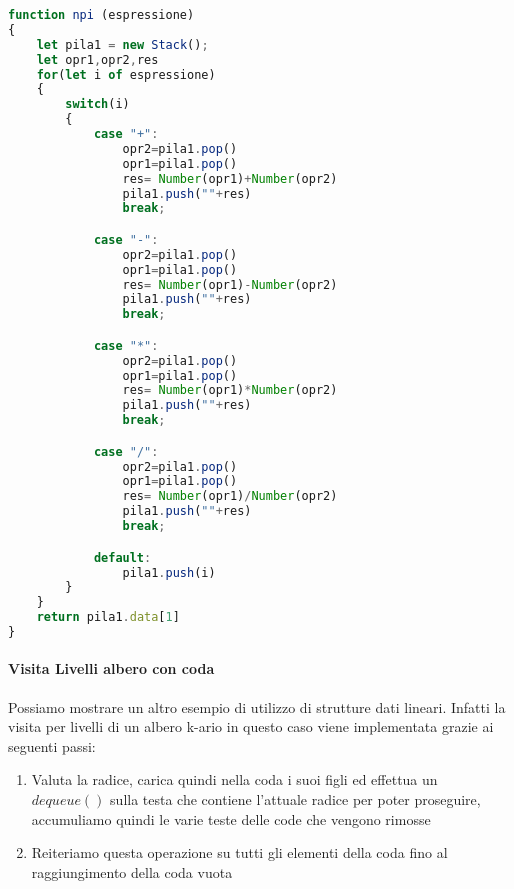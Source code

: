 \documentclass{article}
\begin{document}
\begin{lstlisting}[language=JavaScript]
function npi (espressione)
{
    let pila1 = new Stack();
    let opr1,opr2,res
    for(let i of espressione)
    {
        switch(i)
        {
            case "+":
                opr2=pila1.pop()
                opr1=pila1.pop()
                res= Number(opr1)+Number(opr2)
                pila1.push(""+res)
                break;

            case "-":
                opr2=pila1.pop()
                opr1=pila1.pop()
                res= Number(opr1)-Number(opr2)
                pila1.push(""+res)
                break;

            case "*":
                opr2=pila1.pop()
                opr1=pila1.pop()
                res= Number(opr1)*Number(opr2)
                pila1.push(""+res)
                break;

            case "/":
                opr2=pila1.pop()
                opr1=pila1.pop()
                res= Number(opr1)/Number(opr2)
                pila1.push(""+res)
                break;

            default:
                pila1.push(i)
        }
    }
    return pila1.data[1]
} 
\end{lstlisting}


\newpage

\paragraph{Visita Livelli albero con coda} Possiamo mostrare un altro esempio di utilizzo di strutture dati lineari. Infatti la visita per livelli di un albero k-ario in questo caso viene implementata grazie ai seguenti passi:

\begin{enumerate}
    \item Valuta la radice, carica quindi nella coda i suoi figli ed effettua un $dequeue()$ sulla testa che contiene l'attuale radice per poter proseguire, accumuliamo quindi le varie teste delle code che vengono rimosse
    \item Reiteriamo questa operazione su tutti gli elementi della coda fino al raggiungimento della coda vuota
\end{enumerate}
\end{document}
